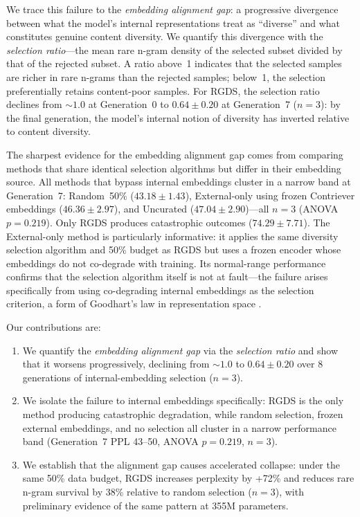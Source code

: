 We trace this failure to the \emph{embedding alignment gap}: a progressive divergence between what the model's internal representations treat as ``diverse'' and what constitutes genuine content diversity. We quantify this divergence with the \emph{selection ratio}---the mean rare n-gram density of the selected subset divided by that of the rejected subset. A ratio above~1 indicates that the selected samples are richer in rare n-grams than the rejected samples; below~1, the selection preferentially retains content-poor samples. For RGDS, the selection ratio declines from ${\sim}1.0$ at Generation~0 to $0.64 \pm 0.20$ at Generation~7 ($n{=}3$): by the final generation, the model's internal notion of diversity has inverted relative to content diversity.

The sharpest evidence for the embedding alignment gap comes from comparing methods that share identical selection algorithms but differ in their embedding source. All methods that bypass internal embeddings cluster in a narrow band at Generation~7: Random~50\% ($43.18 \pm 1.43$), External-only using frozen Contriever \citep{izacard2022unsupervised} embeddings ($46.36 \pm 2.97$), and Uncurated ($47.04 \pm 2.90$)---all $n{=}3$ (ANOVA $p = 0.219$). Only RGDS produces catastrophic outcomes ($74.29 \pm 7.71$). The External-only method is particularly informative: it applies the same diversity selection algorithm and 50\% budget as RGDS but uses a frozen encoder whose embeddings do not co-degrade with training. Its normal-range performance confirms that the selection algorithm itself is not at fault---the failure arises specifically from using co-degrading internal embeddings as the selection criterion, a form of Goodhart's law in representation space \citep{gao2023scaling, karwowski2024goodhart}.

Our contributions are:
\begin{enumerate}
    \item We quantify the \emph{embedding alignment gap} via the \emph{selection ratio} and show that it worsens progressively, declining from ${\sim}1.0$ to $0.64 \pm 0.20$ over 8 generations of internal-embedding selection ($n{=}3$).
    \item We isolate the failure to internal embeddings specifically: RGDS is the only method producing catastrophic degradation, while random selection, frozen external embeddings, and no selection all cluster in a narrow performance band (Generation~7 PPL 43--50, ANOVA $p = 0.219$, $n{=}3$).
    \item We establish that the alignment gap causes accelerated collapse: under the same 50\% data budget, RGDS increases perplexity by +72\% and reduces rare n-gram survival by 38\% relative to random selection ($n{=}3$), with preliminary evidence of the same pattern at 355M parameters.
\end{enumerate}